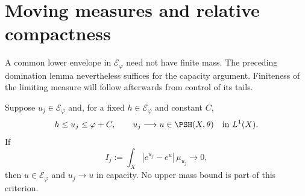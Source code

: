 \section{Moving measures and relative compactness}

A common lower envelope in $\mathcal E_\varphi$ need not have finite mass. The preceding domination lemma nevertheless suffices for the capacity argument. Finiteness of the limiting measure will follow afterwards from control of its tails.

\begin{proposition}\label{prop:relative-common-envelope-criterion}
Suppose $u_j\in\mathcal E_\varphi$ and, for a fixed $h\in\mathcal E_\varphi$ and constant $C$,
\[
 h\leq u_j\leq\varphi+C,\qquad
 u_j\longrightarrow u\in\PSH(X,\theta)\quad\hbox{in }L^1(X).
\]
If
\[
 I_j:=\int_X|e^{u_j}-e^u|\,\mu_{u_j}\longrightarrow0,
\]
then $u\in\mathcal E_\varphi$ and $u_j\to u$ in capacity. No upper mass bound is part of this criterion.
\end{proposition}

